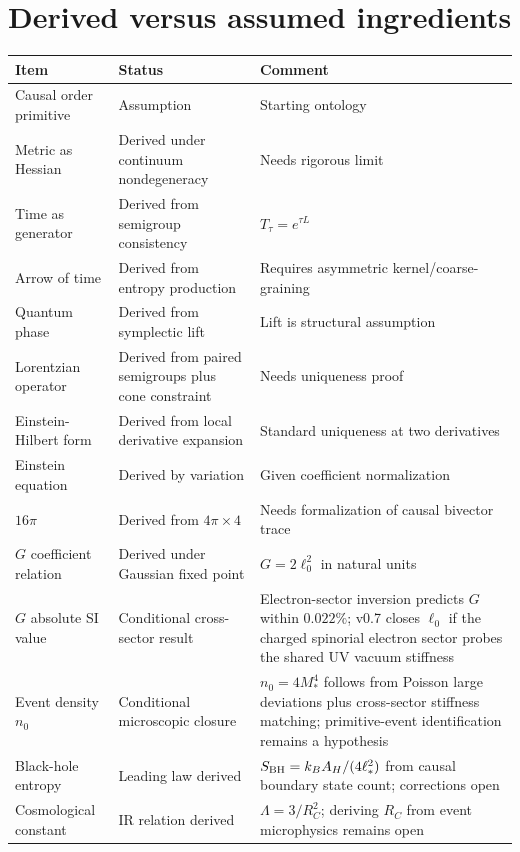 \documentclass[11pt]{article}
\begin{document}
\section{Derived versus assumed ingredients}

\begin{center}
\small
\renewcommand{\arraystretch}{1.15}
\begin{tabularx}{\textwidth}{>{\raggedright\arraybackslash}p{}>{\raggedright\arraybackslash}p{}X}
\toprule
Item & Status & Comment\\
\midrule
Causal order primitive & Assumption & Starting ontology\\
Metric as Hessian & Derived under continuum nondegeneracy & Needs rigorous limit\\
Time as generator & Derived from semigroup consistency & $T_\tau=e^{\tau L}$\\
Arrow of time & Derived from entropy production & Requires asymmetric kernel/coarse-graining\\
Quantum phase & Derived from symplectic lift & Lift is structural assumption\\
Lorentzian operator & Derived from paired semigroups plus cone constraint & Needs uniqueness proof\\
Einstein-Hilbert form & Derived from local derivative expansion & Standard uniqueness at two derivatives\\
Einstein equation & Derived by variation & Given coefficient normalization\\
$16\pi$ & Derived from $4\pi\times4$ & Needs formalization of causal bivector trace\\
$G$ coefficient relation & Derived under Gaussian fixed point & $G=2\ell_0^2$ in natural units\\
$G$ absolute SI value & Conditional cross-sector result & Electron-sector inversion predicts $G$ within $0.022\%$; v0.7 closes $\ell_0$ if the charged spinorial electron sector probes the shared UV vacuum stiffness\\
Event density $n_0$ & Conditional microscopic closure & $n_0=4M_*^4$ follows from Poisson large deviations plus cross-sector stiffness matching; primitive-event identification remains a hypothesis\\
Black-hole entropy & Leading law derived & $S_{\rm BH}=k_BA_H/(4\ell_*^2)$ from causal boundary state count; corrections open\\
Cosmological constant & IR relation derived & $\Lambda=3/R_C^2$; deriving $R_C$ from event microphysics remains open\\
\bottomrule
\end{tabularx}
\end{center}
\end{document}
